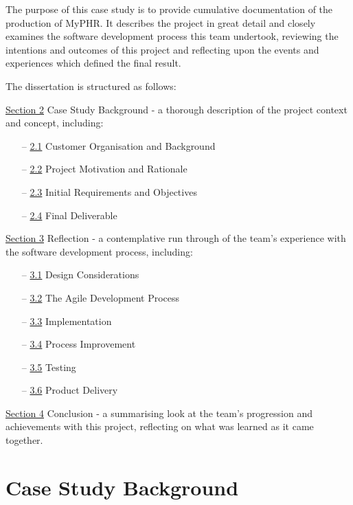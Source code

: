 \documentclass{l3proj}
\begin{document}
The purpose of this case study is to provide cumulative documentation of the production of MyPHR. It describes the project in great detail and closely examines the software development process this team undertook, reviewing the intentions and outcomes of this project and reflecting upon the events and experiences which defined the final result.

The dissertation is structured as follows:

\hyperref[sec:2]{Section 2} Case Study Background - a thorough description of the project context and concept, including:
\begin{itemize} 
    \item[--] \hyperref[sec:2.1]{2.1} Customer Organisation and Background
    \item[--] \hyperref[sec:2.2]{2.2} Project Motivation and Rationale
    \item[--] \hyperref[sec:2.3]{2.3} Initial Requirements and Objectives
    \item[--] \hyperref[sec:2.4]{2.4} Final Deliverable
\end{itemize}


\hyperref[sec:3]{Section 3} Reflection - a contemplative run through of the team's experience with the software development process, including:
\begin{itemize} 
    \item[--] \hyperref[sec:3.1]{3.1} Design Considerations
    \item[--] \hyperref[sec:3.2]{3.2} The Agile Development Process
    \item[--] \hyperref[sec:3.3]{3.3} Implementation
    \item[--] \hyperref[sec:3.4]{3.4} Process Improvement
    \item[--] \hyperref[sec:3.5]{3.5} Testing
    \item[--] \hyperref[sec:3.6]{3.6} Product Delivery
\end{itemize}

\hyperref[sec:4]{Section 4} Conclusion - a summarising look at the team's progression and achievements with this project, reflecting on what was learned as it came together.


\section{Case Study Background}\label {sec:2}
\end{document}
